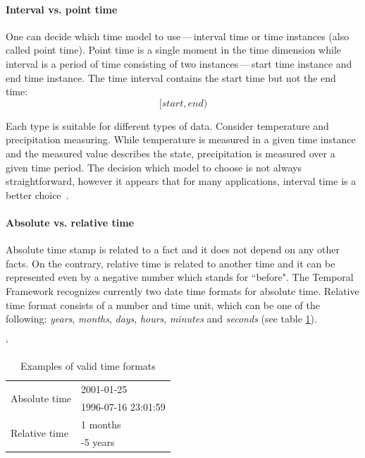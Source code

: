 \documentclass[a4paper,12pt,oneside]{book}
\newcommand{\tf}{Temporal Framework\xspace}
\newcommand{\dash}{\mbox{\,---\,}}
\begin{document}
\paragraph{Interval vs. point time}
\label{sec:intervalVsPoint}
One can decide which time model to use\dash interval time or time instances (also called point time).
Point time is a single moment in the time dimension
while interval is a period of time consisting of two instances\dash start time instance and end time instance.
The time interval contains the start time but not the end time:
$$[start, end)$$

Each type is suitable for different types of data.
Consider temperature and precipitation measuring.
While temperature is measured in a given time instance and the measured value describes the state,
precipitation is measured over a given time period. The decision which model to choose is not always
straightforward, however it appears that for many applications,
interval time is a better choice~\cite{pointVsInterval}.

\paragraph{Absolute vs. relative time}
\label{sec:absoluteVsRelative}
Absolute time stamp is related to a fact and it does not depend on any other facts.
On the contrary, relative time is related to another time and
it can be represented even by a negative number which stands for ``before".
The \tf recognizes currently two date time formats for absolute time.
Relative time format consists of a number and time unit, which can be one of the following: \emph{years},
\emph{months}, \emph{days}, \emph{hours}, \emph{minutes} and \emph{seconds} (see table \ref{tab:timeFormat}).

\begin{table}[ht!]
  \centering
  \catcode`
\caption{Examples of valid time formats}
\label{tab:timeFormat}
\setlength{\extrarowheight}{3pt}
\begin{tabular}{|l|l|}
\hline
\multirow{2}{*}{Absolute time}
 & 2001-01-25  \\ \cline{2-2}
 & 1996-07-16 23:01:59  \\\cline{2-2}
 \hline
\multirow{2}{*}{Relative time}
 & 1 months  \\\cline{2-2}
 & -5 years  \\
 \hline
\end{tabular}
\end{table}
\end{document}
